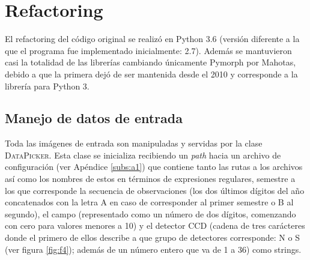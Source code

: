 \chapter{Refactoring}
\label{ch:refactoring}
El refactoring del c\'odigo original se realiz\'o en Python 3.6 (versi\'on diferente a la que el programa fue implementado inicialmente: 2.7). Adem\'as se mantuvieron casi la totalidad de las librer\'ias cambiando \'unicamente Pymorph por Mahotas, debido a que la primera dej\'o de ser mantenida desde el 2010 y corresponde a la librer\'ia para Python 3.   

\section{Manejo de datos de entrada}
Toda las im\'agenes de entrada son manipuladas y servidas por la clase \textsc{DataPicker}. Esta clase se inicializa recibiendo un \textit{path} hacia un archivo de configuraci\'on (ver Ap\'endice \ref{subs:a1}) que contiene tanto las rutas a los archivos as\'i como los nombres de estos en t\'erminos de expresiones regulares, semestre a los que corresponde la secuencia de observaciones (los dos \'ultimos d\'igitos del a\~no concatenados con la letra A en caso de corresponder al primer semestre o B al segundo), el campo (representado como un n\'umero de dos d\'igitos, comenzando con cero para valores menores a 10) y el detector CCD (cadena de tres car\'acteres donde el primero de ellos describe a que grupo de detectores corresponde: N o S (ver figura \ref{fig:f4}); adem\'as de un n\'umero entero que va de 1 a 36) como strings. 
\bigskip

